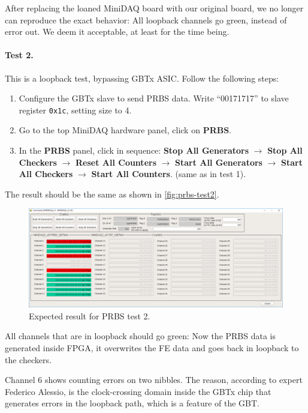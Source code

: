 After replacing the loaned MiniDAQ board with our original board, we no longer
can reproduce the exact behavior:
All loopback channels go green, instead of error out.
We deem it acceptable, at least for the time being.

\paragraph{Test 2.}
This is a loopback test, bypassing GBTx ASIC.
Follow the following steps:
\begin{enumerate}
    \item Configure the GBTx slave to send PRBS data. Write ``00171717'' to
        slave register \texttt{0x1c}, setting size to 4.
    \item Go to the top MiniDAQ hardware panel, click on \textbf{PRBS}.
    \item In the \textbf{PRBS} panel, click in sequence:
        \textbf{Stop All Generators} $\to$ \textbf{Stop All Checkers} $\to$
        \textbf{Reset All Counters} $\to$
        \textbf{Start All Generators} $\to$ \textbf{Start All Checkers} $\to$
        \textbf{Start All Counters}. (same as in test 1).
\end{enumerate}

The result should be the same as shown in \autoref{fig:prbs-test2}.

\begin{figure}[ht]
    \centering
    \includegraphics[width=\textwidth]{res/prbs_test2.png}
    \caption{Expected result for PRBS test 2.}
    \label{fig:prbs-test2}
\end{figure}

\begin{leftbar}
    All channels that are in loopback should go green: Now the PRBS data is
    generated inside FPGA, it overwrites the FE data and goes back in loopback
    to the checkers.
\end{leftbar}

\begin{leftbar}
    Channel 6  shows counting errors on two nibbles.
    The reason, according to expert Federico Alessio, is the clock-crossing
    domain inside the GBTx chip that generates errors in the loopback path,
    which is a feature of the GBT.
\end{leftbar}

